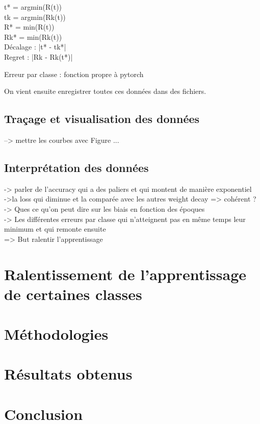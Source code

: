 \documentclass[12pt,english, openany]{book}
\begin{document}
t* = argmin(R(t))\\
tk = argmin(Rk(t)) \\
R* = min(R(t)) \\
Rk* = min(Rk(t))\\ 

Décalage : |t* - tk*|\\
Regret : |Rk - Rk(t*)|

Erreur par classe : fonction propre à pytorch

On vient ensuite enregistrer toutes ces données dans des fichiers.
\section{Traçage et visualisation des données}
--> mettre les courbes avec Figure ...

\section{Interprétation des données}
-> parler de l'accuracy qui a des paliers et qui montent de manière exponentiel\\
->la loss qui diminue et la comparée avec les autres weight decay => cohérent ?\\
-> Ques ce qu'on peut dire sur les biais en fonction des époques\\
-> Les différentes erreurs par classe qui n'atteignent pas en même temps leur minimum et qui remonte ensuite \\

=> But ralentir l'apprentissage 

\chapter{Ralentissement de l'apprentissage de certaines classes}


\chapter{Méthodologies}



	

 




\chapter{Résultats obtenus}




\chapter{Conclusion}



\end{document}

